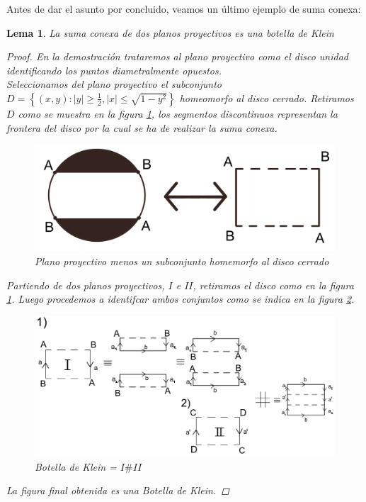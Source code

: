\documentclass[a4paper,11pt,spanish, twoside, leqno]{tfg-uam}
\newtheorem{lema}[teor]{Lema}
\theoremstyle{definition}
\begin{document}
 
Antes de dar el asunto por concluido, veamos un último ejemplo de suma conexa:
\begin{lema}\label{lema:SumaDosPlanospEsKlein}
	La suma conexa de dos planos proyectivos es una botella de \textit{Klein}
	\begin{proof}
		En la demostración trataremos al plano proyectivo como el disco unidad identificando los puntos diametralmente opuestos.\\
		Seleccionamos del plano proyectivo el subconjunto $D = \left\{(x,y): |y|\geq\frac{1}{2}, |x|\leq\sqrt{1-y^2} \right\}$  homeomorfo al disco cerrado. Retiramos $ D $ como se muestra en la figura \ref{fig:planop sin D}, los segmentos discontinuos representan la frontera del disco por la cual se ha de realizar la suma conexa.
		\begin{figure}[h!]
			\centering
			\includegraphics[width=0.4\linewidth]{imagenes/planop_sinD.png}
			\caption{Plano proyectivo menos un subconjunto homemorfo al disco cerrado}
			\label{fig:planop sin D}
		\end{figure} 
		
		Partiendo de dos planos proyectivos,  $I$ e $II$, retiramos el disco como en la figura \ref{fig:planop sin D}. Luego procedemos a identifcar ambos conjuntos como se indica en la figura \ref{fig:sumaconexadeppsEnLema}.
		
		\begin{figure}[h!]
			\centering
			\includegraphics[width=0.8\linewidth]{imagenes/sumappsEnLema.png}
			\caption{Botella de \textit{Klein} = $ I \# II$}
			\label{fig:sumaconexadeppsEnLema}
		\end{figure} 
		La figura final obtenida  es una \textit{Botella de Klein}.
	\end{proof}
\end{lema}
\end{document}
